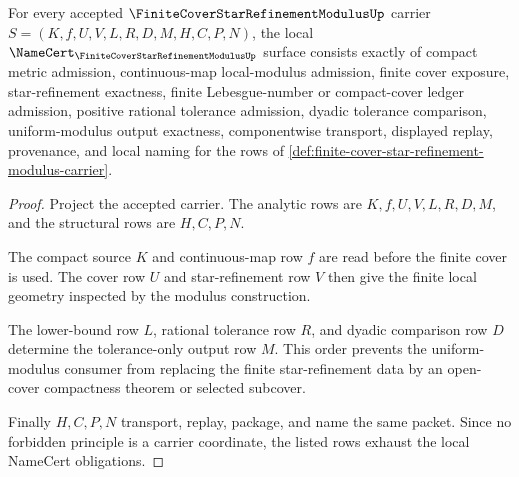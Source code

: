 \begin{theorem}
\label{thm:finite-cover-star-refinement-modulus-namecert-obligations}
For every accepted $\FiniteCoverStarRefinementModulusUp$ carrier $S=(K,f,U,V,L,R,D,M,H,C,P,N)$, the local $\NameCert_{\FiniteCoverStarRefinementModulusUp}$ surface consists exactly of compact metric admission, continuous-map local-modulus admission, finite cover exposure, star-refinement exactness, finite Lebesgue-number or compact-cover ledger admission, positive rational tolerance admission, dyadic tolerance comparison, uniform-modulus output exactness, componentwise transport, displayed replay, provenance, and local naming for the rows of \autoref{def:finite-cover-star-refinement-modulus-carrier}.
\end{theorem}
\begin{proof}
Project the accepted carrier. The analytic rows are $K,f,U,V,L,R,D,M$, and the structural rows are $H,C,P,N$.

The compact source $K$ and continuous-map row $f$ are read before the finite cover is used. The cover row $U$ and star-refinement row $V$ then give the finite local geometry inspected by the modulus construction.

The lower-bound row $L$, rational tolerance row $R$, and dyadic comparison row $D$ determine the tolerance-only output row $M$. This order prevents the uniform-modulus consumer from replacing the finite star-refinement data by an open-cover compactness theorem or selected subcover.

Finally $H,C,P,N$ transport, replay, package, and name the same packet. Since no forbidden principle is a carrier coordinate, the listed rows exhaust the local NameCert obligations.
\end{proof}

